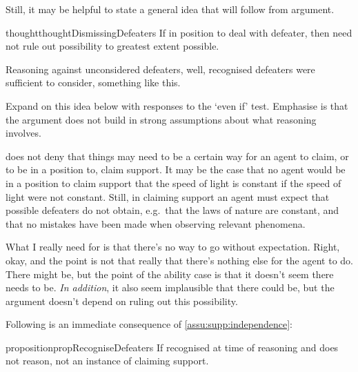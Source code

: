 \begin{note}
  Still, it may be helpful to state a general idea that will follow from argument.

  \begin{restatable}[]{thought}{thoughtDismissingDefeaters}\label{thought:dismissing-defeaters}
    If in position to deal with defeater, then need not rule out possibility to greatest extent possible.

    Reasoning against unconsidered defeaters, well, recognised defeaters were sufficient to consider, something like this.
  \end{restatable}

  Expand on this idea below with responses to the `even if' test.
  Emphasise is that the argument does not build in strong assumptions about what reasoning involves.
\end{note}

\begin{note}
  \eiS{} does not deny that things may need to be a certain way for an agent to claim, or to be in a position to, claim support.
  It may be the case that no agent would be in a position to claim support that the speed of light is constant if the speed of light were not constant.
  Still, in claiming support an agent must expect that possible defeaters do not obtain, e.g.\ that the laws of nature are constant, and that no mistakes have been made when observing relevant phenomena.
\end{note}

{
  \color{blue}
  What I really need for \nI{} is that there's no way to go without expectation.
  Right, okay, and the point is not that really that there's nothing else for the agent to do.
  There might be, but the point of the ability case is that it doesn't seem there needs to be.
  \emph{In addition}, it also seem implausible that there could be, but the argument doesn't depend on ruling out this possibility.
}

\begin{note}
  Following is an immediate consequence of \autoref{assu:supp:independence}:

  \begin{restatable}{proposition}{propRecogniseDefeaters}\label{prop:CS-only-if-reason-recognised-defeaters}
    If recognised \requ{} at time of reasoning and does not reason, not an instance of claiming support.
  \end{restatable}
\end{note}

